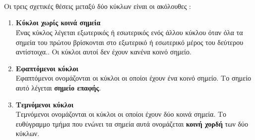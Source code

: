 \documentclass[twoside,nofonts,internet,shmeiwseis]{thewria}
\begin{document}
\orismoi
{}
\mbox{}\\\\\\
Οι τρεις σχετικές θέσεις μεταξύ δύο κύκλων είναι οι ακόλουθες :
\begin{enumerate}[itemsep=0mm,label=\bf\arabic*.]
\item \textbf{Κύκλοι χωρίς κοινά σημεία}\\
Ένας κύκλος λέγεται εξωτερικός ή εσωτερικός ενός άλλου κύκλου όταν όλα τα σημεία του πρώτου βρίσκονται στο εξωτερικό ή εσωτερικό μέρος του δεύτερου αντίστοιχα.. Οι κύκλοι αυτοί δεν έχουν κανένα κοινό σημείο.
\item \textbf{Εφαπτόμενοι κύκλοι}\\
Εφαπτόμενοι ονομάζονται οι κύκλοι οι οποίοι έχουν ένα κοινό σημείο. Το σημείο αυτό λέγεται \textbf{σημείο επαφής}.
\item \textbf{Τεμνόμενοι κύκλοι}\\
Τεμνόμενοι ονομάζονται οι κύκλοι οι οποίοι έχουν δύο κοινά σημεία. Το ευθύγραμμο τμήμα που ενώνει τα σημεία αυτά ονομάζεται \textbf{κοινή χορδή} των δύο κύκλων.
\end{enumerate}
\end{document}
